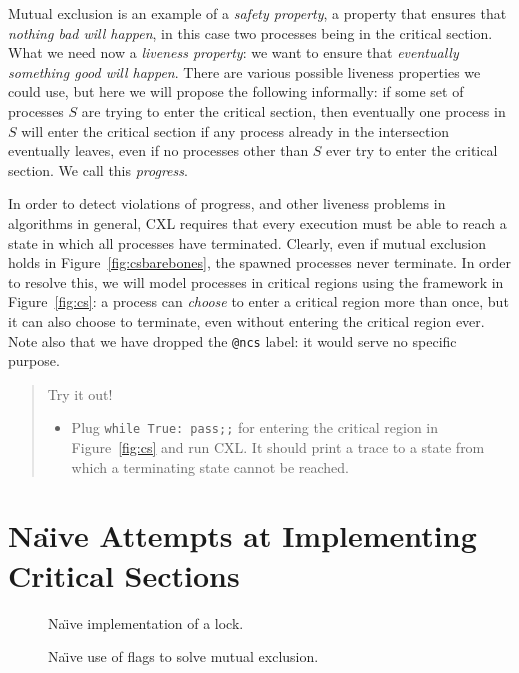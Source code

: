 \documentclass{report}
\newenvironment{code}{
\tcolorbox
}{
\endtcolorbox
}
\begin{document}
Mutual exclusion is an example of a \emph{safety property}, a
property that ensures that \emph{nothing bad will happen}, in this case
two processes being in the critical section.
What we need now a \emph{liveness property}: we want to ensure that
\emph{eventually something good will happen}.
There are various possible liveness properties we could use,
but here we will propose the following informally: if some set of processes
$S$ are trying to enter the critical section, then eventually one process in
$S$ will enter the critical section if any process already in the
intersection eventually leaves, even if no processes other than $S$ ever
try to enter the critical section.
We call this \emph{progress}.

In order to detect violations of progress, and other liveness problems in
algorithms in general, CXL requires that every execution must be
able to reach a state in which all processes have terminated.
Clearly, even if mutual exclusion holds in Figure~\ref{fig:csbarebones},
the spawned processes never terminate.  In order to resolve this, we
will model processes in critical regions using the framework in
Figure~\ref{fig:cs}: a process can \emph{choose} to enter a
critical region more than once, but it can also choose to terminate, even
without entering the critical region ever.
Note also that we have dropped the \texttt{@ncs} label: it would serve no
specific purpose.

\begin{quote}
Try it out!
\begin{itemize}
\item Plug \texttt{while True: pass;;} for entering the critical region
in Figure~\ref{fig:cs} and run CXL.  It should print a trace
to a state from which a terminating state cannot be reached.
\end{itemize}
\end{quote}


\chapter{Na\"{\i}ve Attempts at Implementing Critical Sections}

\begin{figure}
\begin{code}

\end{code}
\caption{Na\"{\i}ve implementation of a lock.}
\label{fig:uplock}
\end{figure}

\begin{figure}
\begin{code}

\end{code}
\caption{Na\"{\i}ve use of flags to solve mutual exclusion.}
\label{fig:upflags}
\end{figure}
\end{document}
